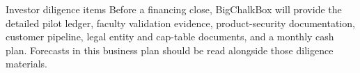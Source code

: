 \documentclass[11pt,a4paper]{article}
\begin{document}
\begin{callout}{Investor diligence items}
Before a financing close, BigChalkBox will provide the detailed pilot ledger, faculty validation evidence, product-security documentation, customer pipeline, legal entity and cap-table documents, and a monthly cash plan. Forecasts in this business plan should be read alongside those diligence materials.
\end{callout}
\end{document}
